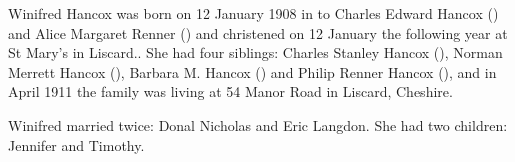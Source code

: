 
Winifred Hancox was born on 12 January 1908 in \cite{BMD1907} to Charles Edward Hancox () and Alice Margaret Renner () \cite{WHancoxBirth} and christened on 12 January the following year at St Mary's in Liscard.\cite{ParishReg}. She had four siblings: Charles Stanley Hancox (), Norman Merrett Hancox (), Barbara M. Hancox () and Philip Renner Hancox (), and in April 1911 the family was living at 54 Manor Road in Liscard, Cheshire.\cite{1911Census}

Winifred married twice: Donal Nicholas and Eric Langdon.  She had two children: Jennifer and Timothy.

